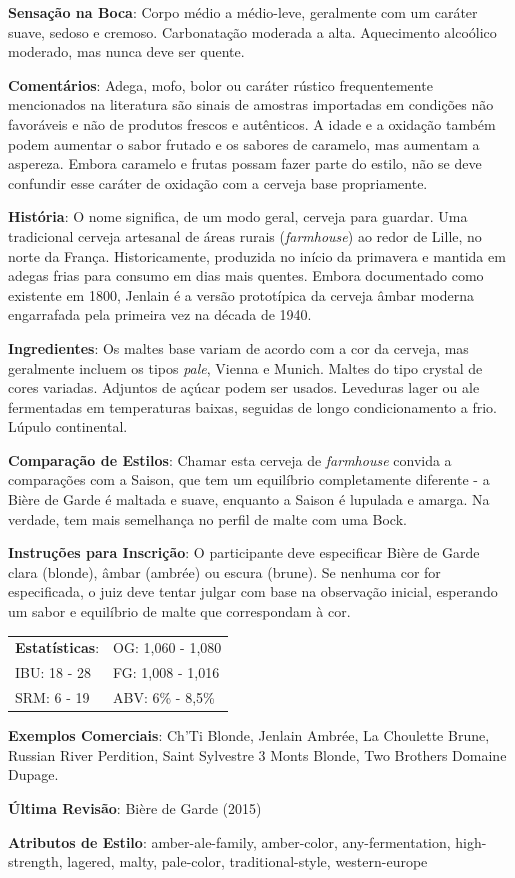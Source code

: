 \textbf{Sensação na Boca}: Corpo médio a médio-leve, geralmente com um caráter suave, sedoso e cremoso. Carbonatação moderada a alta. Aquecimento alcoólico moderado, mas nunca deve ser quente.

\textbf{Comentários}: Adega, mofo, bolor ou caráter rústico frequentemente mencionados na literatura são sinais de amostras importadas em condições não favoráveis e não de produtos frescos e autênticos. A idade e a oxidação também podem aumentar o sabor frutado e os sabores de caramelo, mas aumentam a aspereza. Embora caramelo e frutas possam fazer parte do estilo, não se deve confundir esse caráter de oxidação com a cerveja base propriamente.

\textbf{História}: O nome significa, de um modo geral, cerveja para guardar. Uma tradicional cerveja artesanal de áreas rurais (\textit{farmhouse}) ao redor de Lille, no norte da França. Historicamente, produzida no início da primavera e mantida em adegas frias para consumo em dias mais quentes. Embora documentado como existente em 1800, Jenlain é a versão prototípica da cerveja âmbar moderna engarrafada pela primeira vez na década de 1940.

\textbf{Ingredientes}: Os maltes base variam de acordo com a cor da cerveja, mas geralmente incluem os tipos \textit{pale}, Vienna e Munich. Maltes do tipo crystal de cores variadas. Adjuntos de açúcar podem ser usados. Leveduras lager ou ale fermentadas em temperaturas baixas, seguidas de longo condicionamento a frio. Lúpulo continental.

\textbf{Comparação de Estilos}: Chamar esta cerveja de \textit{farmhouse} convida a comparações com a Saison, que tem um equilíbrio completamente diferente - a Bière de Garde é maltada e suave, enquanto a Saison é lupulada e amarga. Na verdade, tem mais semelhança no perfil de malte com uma Bock.

\textbf{Instruções para Inscrição}: O participante deve especificar Bière de Garde clara (blonde), âmbar (ambrée) ou escura (brune). Se nenhuma cor for especificada, o juiz deve tentar julgar com base na observação inicial, esperando um sabor e equilíbrio de malte que correspondam à cor.

\begin{tabular}{@{}p{35mm}p{35mm}@{}}
  \textbf{Estatísticas}: & OG: 1,060 - 1,080 \\
  IBU: 18 - 28  & FG: 1,008 - 1,016  \\
  SRM: 6 - 19  & ABV: 6\% - 8,5\%
\end{tabular}

\textbf{Exemplos Comerciais}: Ch’Ti Blonde, Jenlain Ambrée, La Choulette Brune, Russian River Perdition, Saint Sylvestre 3 Monts Blonde, Two Brothers Domaine Dupage.

\textbf{Última Revisão}: Bière de Garde (2015)

\textbf{Atributos de Estilo}: amber-ale-family, amber-color, any-fermentation, high-strength, lagered, malty, pale-color, traditional-style, western-europe

